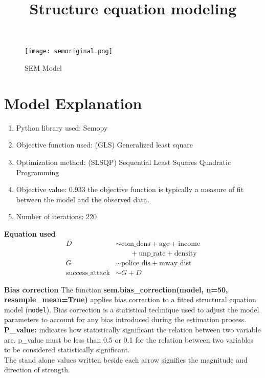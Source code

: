 \documentclass[10pt, conference, compsocconf]{IEEEtran}
\title{Structure equation modeling}
\begin{document}
	
	
\maketitle


\begin{figure}[h!]
	\centering
	\texttt{[image: semoriginal.png]}
	\caption{SEM Model}
	\label{fig:Model}
\end{figure}

	
\section{Model Explanation}	
	
	
	\begin{enumerate}
		\item Python library used: Semopy
		\item  Objective function used: (GLS) Generalized least square
		\item Optimization method: (SLSQP) Sequential Least Squares Quadratic Programming
		\item Objective value: 0.933 the objective function is typically a measure of fit between the model and the observed data.
		\item Number of iterations: 220
	\end{enumerate}
\textbf{Equation used}
\begin{subequations}
	\begin{align}
		D &\sim \text{com\_dens} + \text{age} + \text{income} \nonumber \\
		&\qquad + \text{unp\_rate} + \text{density} \\
		G &\sim \text{police\_dis} + \text{mway\_dist} \\
		\text{success\_attack} &\sim G + D
	\end{align}
\end{subequations}
	
\textbf{Bias correction}	
	The function \textbf{sem.bias\_correction(model, n=50, resample\_mean=True)} applies bias correction to a fitted structural equation model (\texttt{model}). Bias correction is a statistical technique used to adjust the model parameters to account for any bias introduced during the estimation process.\\
	
	
	
	\textbf{P\_value:} indicates how statistically significant the relation between two variable are. p\_value must be less than 0.5 or 0.1 for the relation between two variables to be considered statistically significant.\\
	The stand alone values written beside each arrow signifies the magnitude and direction of strength.
	 
\end{document}
